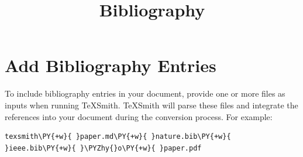 \documentclass[a4paper,twoside]{article}
\title{Bibliography}
\author{}\date{}
\begin{document}
\maketitle
\section{Add Bibliography Entries}
To include bibliography entries in your document, provide one or more  files as inputs when running TeXSmith. TeXSmith will parse these files and integrate the references into your document during the conversion process. For example:
\begin{tscode}[lang=bash, engine=pygments]
\begin{Verbatim}[commandchars=\\\{\},breaklines, breakanywhere, commandchars=\\\{\}]
texsmith\PY{+w}{ }paper.md\PY{+w}{ }nature.bib\PY{+w}{ }ieee.bib\PY{+w}{ }\PYZhy{}o\PY{+w}{ }paper.pdf
\end{Verbatim}
\end{tscode}
\end{document}
